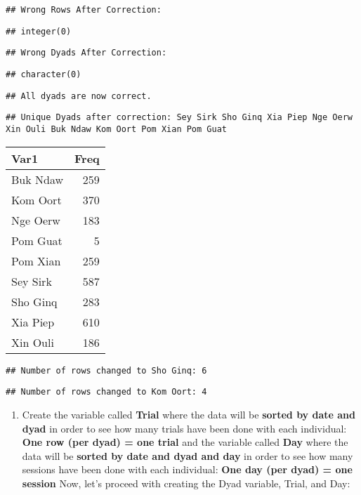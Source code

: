 \documentclass[
]{article}
\providecommand{\tightlist}{%
  \setlength{\itemsep}{0pt}\setlength{\parskip}{0pt}}
\begin{document}
\begin{verbatim}
## Wrong Rows After Correction:
\end{verbatim}

\begin{verbatim}
## integer(0)
\end{verbatim}

\begin{verbatim}
## Wrong Dyads After Correction:
\end{verbatim}

\begin{verbatim}
## character(0)
\end{verbatim}

\begin{verbatim}
## All dyads are now correct.
\end{verbatim}

\begin{verbatim}
## Unique Dyads after correction: Sey Sirk Sho Ginq Xia Piep Nge Oerw Xin Ouli Buk Ndaw Kom Oort Pom Xian Pom Guat
\end{verbatim}

\begin{longtable}[]{@{}lr@{}}
\toprule
Var1 & Freq \\
\midrule
\endhead
Buk Ndaw & 259 \\
Kom Oort & 370 \\
Nge Oerw & 183 \\
Pom Guat & 5 \\
Pom Xian & 259 \\
Sey Sirk & 587 \\
Sho Ginq & 283 \\
Xia Piep & 610 \\
Xin Ouli & 186 \\
\bottomrule
\end{longtable}

\begin{verbatim}
## Number of rows changed to Sho Ginq: 6
\end{verbatim}

\begin{verbatim}
## Number of rows changed to Kom Oort: 4
\end{verbatim}

\begin{enumerate}
\def\labelenumi{\arabic{enumi}.}
\setcounter{enumi}{2}
\tightlist
\item
  Create the variable called \textbf{Trial} where the data will be
  \textbf{sorted by date and dyad} in order to see how many trials have
  been done with each individual: \textbf{One row (per dyad) = one
  trial} and the variable called \textbf{Day} where the data will be
  \textbf{sorted by date and dyad and day} in order to see how many
  sessions have been done with each individual: \textbf{One day (per
  dyad) = one session} Now, let's proceed with creating the Dyad
  variable, Trial, and Day:
\end{enumerate}
\end{document}
